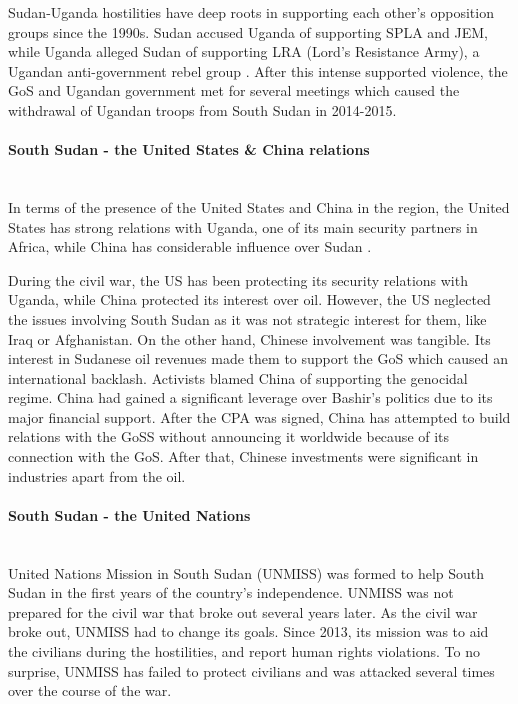 \documentclass[14pt,a4paper]{article}
\begin{document}
Sudan-Uganda hostilities have deep roots in supporting each other's opposition groups since the 1990s. Sudan accused Uganda of supporting SPLA and JEM, while Uganda alleged Sudan of supporting LRA (Lord's Resistance Army), a Ugandan anti-government rebel group \cite{chinese}. After this intense supported violence, the GoS and Ugandan government met for several meetings which caused the withdrawal of Ugandan troops from South Sudan in 2014-2015. 

\paragraph{South Sudan - the United States \& China relations} \mbox{}\\
In terms of the presence of the United States and China in the region, the United States has strong relations with Uganda, one of its main security partners in Africa, while China has considerable influence over Sudan \cite{chinese}.

During the civil war, the US has been protecting its security relations with Uganda, while China protected its interest over oil. However, the US neglected the issues involving South Sudan as it was not strategic interest for them, like Iraq or Afghanistan. On the other hand, Chinese involvement was tangible. Its interest in Sudanese oil revenues made them to support the GoS which caused an international backlash. Activists blamed China of supporting the genocidal regime. China had gained a significant leverage over Bashir's politics due to its major financial support. After the CPA was signed, China has attempted to build relations with the GoSS without announcing it worldwide because of its connection with the GoS. After that, Chinese investments were significant in industries apart from the oil.

\paragraph{South Sudan - the United Nations} \mbox{}\\
United Nations Mission in South Sudan (UNMISS) was formed to help South Sudan in the first years of the country's independence. UNMISS was not prepared for the civil war that broke out several years later. As the civil war broke out, UNMISS had to change its goals. Since 2013, its mission was to aid the civilians during the hostilities, and report human rights violations. To no surprise, UNMISS has failed to protect civilians and was attacked several times over the course of the war. 
\end{document}
